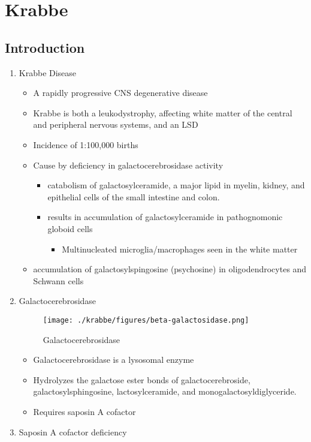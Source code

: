 \documentclass{scrartcl}
\begin{document}
\section{Krabbe}
\label{sec:org8023d50}
\subsection{Introduction}
\label{sec:orgc3f4d06}
\begin{enumerate}
\item Krabbe Disease
\label{sec:orgec79180}
\begin{itemize}
\item A rapidly progressive CNS degenerative disease
\item Krabbe is both a leukodystrophy, affecting white matter of the central
and peripheral nervous systems, and an LSD

\item Incidence of 1:100,000 births
\item Cause by deficiency in galactocerebrosidase activity
\begin{itemize}
\item catabolism of galactosylceramide, a major lipid in myelin, kidney, and epithelial cells of the small intestine and colon.
\item results in accumulation of galactosylceramide in pathognomonic globoid cells
\begin{itemize}
\item Multinucleated microglia/macrophages seen in the white matter
\end{itemize}
\end{itemize}
\item accumulation of galactosylspingosine (psychosine) in oligodendrocytes and Schwann cells
\end{itemize}

\item Galactocerebrosidase
\label{sec:org70e5471}

\begin{figure}[htbp]
\centering
\texttt{[image: ./krabbe/figures/beta-galactosidase.png]}
\caption{\label{fig:orged5e8fe}
Galactocerebrosidase}
\end{figure}

\begin{itemize}
\item Galactocerebrosidase is a lysosomal enzyme
\item Hydrolyzes the galactose ester bonds of galactocerebroside, galactosylsphingosine, lactosylceramide, and monogalactosyldiglyceride.
\item Requires saposin A cofactor
\end{itemize}
\item Saposin A cofactor deficiency
\label{sec:org66a004d}


\end{enumerate}
\end{document}

